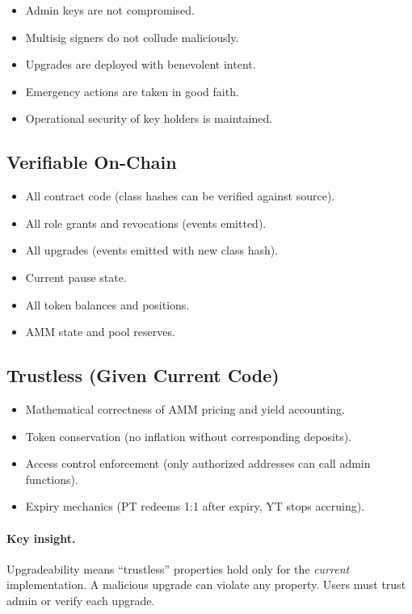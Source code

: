 \begin{itemize}
\item Admin keys are not compromised.
\item Multisig signers do not collude maliciously.
\item Upgrades are deployed with benevolent intent.
\item Emergency actions are taken in good faith.
\item Operational security of key holders is maintained.
\end{itemize}

\subsection{Verifiable On-Chain}

\begin{itemize}
\item All contract code (class hashes can be verified against source).
\item All role grants and revocations (events emitted).
\item All upgrades (events emitted with new class hash).
\item Current pause state.
\item All token balances and positions.
\item AMM state and pool reserves.
\end{itemize}

\subsection{Trustless (Given Current Code)}

\begin{itemize}
\item Mathematical correctness of AMM pricing and yield accounting.
\item Token conservation (no inflation without corresponding deposits).
\item Access control enforcement (only authorized addresses can call admin functions).
\item Expiry mechanics (PT redeems 1:1 after expiry, YT stops accruing).
\end{itemize}

\paragraph{Key insight.}
Upgradeability means ``trustless'' properties hold only for the \emph{current} implementation. A malicious upgrade can violate any property. Users must trust admin or verify each upgrade.


